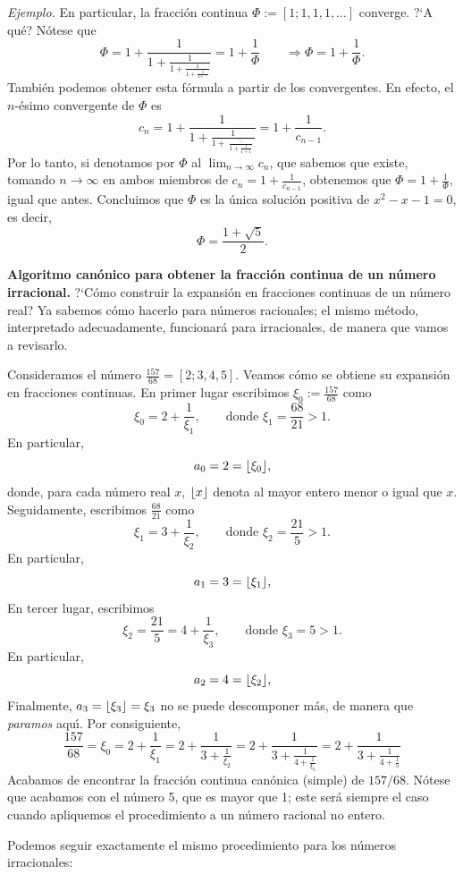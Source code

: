 \noindent\emph{Ejemplo. } En particular, la fracci\'on continua
$\Phi:=[1;1,1,1,\dots]$ converge. ?`A qu\'e? N\'otese que
$$
\Phi=1+\frac1{1+\displaystyle\frac1{1+\displaystyle\frac1{1+\displaystyle\frac1{
1+\ddots}}}}=1+\frac1\Phi\qquad\Rightarrow \Phi=1+\frac1\Phi.
$$
Tambi\'en podemos obtener esta f\'ormula a partir de los convergentes. En
efecto, el $n$-\'esimo convergente de $\Phi$ es 
$$
c_n=1+\frac1{1+\displaystyle\frac1{1+\displaystyle\frac\ddots{
1+\displaystyle\frac1{1+1}}}}=1+\frac1{c_{n-1}}.
$$
Por lo tanto, si denotamos por $\Phi$ al $\lim_{n\to\infty}c_n$, que sabemos que
existe, tomando $n\to\infty$ en ambos miembros de $c_n=1+\frac{1}{c_{n-1}}$,
obtenemos que $\Phi=1+\frac1\Phi$, igual que antes. Concluimos que $\Phi$ es la
\'unica soluci\'on positiva de $x^2-x-1=0$, es decir,
$$
\Phi=\frac{1+\sqrt{5}}2.
$$ 


\noindent\textbf{Algoritmo can\'onico para obtener la fracci\'on continua de un
n\'umero irracional. } ?`C\'omo construir la expansi\'on en fracciones continuas
de un n\'umero real? Ya sabemos c\'omo hacerlo para n\'umeros racionales; el
mismo m\'etodo, interpretado adecuadamente, funcionar\'a para irracionales, de
manera que vamos a revisarlo. 

Consideramos el n\'umero $\frac{157}{68}=[2;3,4,5]$. Veamos c\'omo se obtiene su
expansi\'on en fracciones continuas. En primer lugar escribimos
$\xi_0:=\frac{157}{68}$ como
$$
\xi_0=2+\frac1{\xi_1}, \qquad \text{donde }\xi_1=\frac{68}{21}>1.
$$
En particular, 
$$
a_0=2=\floor \xi_0.,
$$
donde, para cada n\'umero real $x$, $\floor x.$ denota al mayor entero menor o
igual que $x$. Seguidamente, escribimos $\frac{68}{21}$ como
$$
\xi_1=3+\frac1{\xi_2}, \qquad \text{donde }\xi_2=\frac{21}{5}>1.
$$
En particular,
$$
a_1=3=\floor \xi_1.,
$$
En tercer lugar, escribimos
$$
\xi_2=\frac{21}5=4+\frac1{\xi_3}, \qquad \text{donde }\xi_3=5>1.
$$
En particular,
$$
a_2=4=\floor \xi_2.,
$$
Finalmente, $a_3=\floor \xi_3.=\xi_3$ no se puede descomponer m\'as, de manera
que \emph{paramos} aqu\'{\i}. Por consiguiente,
$$
\frac{157}{68}=\xi_0=2+\displaystyle\frac1{\xi_1}=2+\frac1{3+\displaystyle\frac1
{\xi_2}}=2+\frac1{3+\displaystyle\frac1{4+\displaystyle\frac1{\xi_3}}}
=2+\displaystyle\frac1{3+\displaystyle\frac1{4+\displaystyle\frac1{5}}}
$$
Acabamos de encontrar la fracci\'on continua can\'onica (simple) de $157/68$.
N\'otese que acabamos con el n\'umero 5, que es mayor que 1; este ser\'a siempre
el caso cuando apliquemos el procedimiento a un n\'umero racional no entero. 

Podemos seguir exactamente el mismo procedimiento para los n\'umeros
irracionales:

